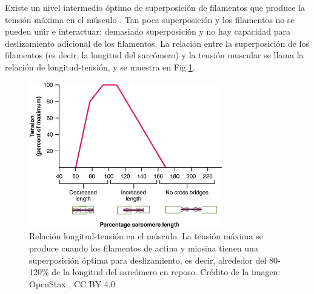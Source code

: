 \documentclass[12pt]{article}
\begin{document}
\vspace{0.2cm}

Existe un nivel intermedio óptimo de superposición de filamentos que
produce la tensión máxima en el músculo \cite{openStax2016nervous}.
Tan poca superposición y los filamentos no se pueden unir e
interactuar; demasiado superposición y no hay capacidad para
deslizamiento adicional de los filamentos. La relación entre la
superposición de los filamentos (es decir, la longitud del sarcómero)
y la tensión muscular se llama la relación de longitud-tensión, y se
muestra en Fig.\ref{fig:tension}.

\vspace{0.2cm}

\begin{figure}[h!]
\centering
\includegraphics[width=0.75\textwidth]{figures/lengthTension.jpg}
\caption{Relación longitud-tensión en el músculo. La tensión máxima se
  produce cuando los filamentos de actina y miosina tienen una
  superposición óptima para deslizamiento, es decir, alrededor del
  80-120\% de la longitud del sarcómero en reposo. Crédito de la
  imagen: OpenStax \cite{openStax2016nervous}, CC BY 4.0}
\label{fig:tension}
\end{figure}
\end{document}
